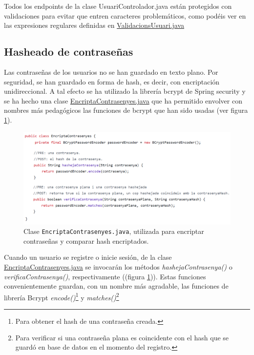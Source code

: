 \documentclass[a4paper,12pt]{report}
\begin{document}
			Todos los endpoints de la clase UsuariControlador.java están protegidos con validaciones para evitar que entren caracteres problemáticos, como podéis ver en las expresiones regulares definidas en \href{https://github.com/blackcub3s/mercApp/blob/main/APP%20WEB/__springboot__produccio__/app/src/main/java/miApp/app/utils/validacio/ValidacionsUsuari.java}{ValidacionsUsuari.java}

			\subsection{Hasheado de contraseñas}
			\label{sec:implementacioHashContra}
			
			Las contraseñas de los usuarios no se han guardado en texto plano. Por seguridad, se han guardado en forma de hash, es decir, con encriptación unidireccional. A tal efecto se ha utilizado la librería bcrypt de Spring security\cite{bcryptPasswordEncoder} y se ha hecho una clase \href{https://github.com/blackcub3s/mercApp/blob/main/APP%20WEB/__springboot__produccio__/app/src/main/java/miApp/app/utils/EncriptaContrasenyes.java}{EncriptaContrasenyes.java} que ha permitido envolver con nombres más pedagógicos las funciones de bcrypt que han sido usadas  (ver figura \ref{fig:hashejatContrasenyes}).
			
			\FloatBarrier
			\begin{figure}[H]
				\centering
				\caption{Clase \texttt{EncriptaContrasenyes.java}, utilizada para encriptar contraseñas y comparar hash encriptados.}
				\label{fig:hashejatContrasenyes}
				\includegraphics[width=1\linewidth]{img/hashejatContrasenyes.png}
			\end{figure}
			\FloatBarrier
			
			Cuando un usuario se registre o inicie sesión,  de la clase \href{https://github.com/blackcub3s/mercApp/blob/main/APP%20WEB/__springboot__produccio__/app/src/main/java/miApp/app/utils/EncriptaContrasenyes.java}{EncriptaContrasenyes.java} se invocarán los métodos \textit{hashejaContrasenya()} o \textit{verificaContrasenya()}, respectivamente ((figura \ref{fig:hashejatContrasenyes})). Estas funciones convenientemente guardan, con un nombre más agradable, las funciones de librería Bcrypt \textit{encode()}\footnote{Para obtener el hash de una contraseña creada.} y \textit{matches()}\footnote{Para verificar si una contraseña plana es coincidente con el hash que se guardó en base de datos en el momento del registro.}
			
\end{document}
